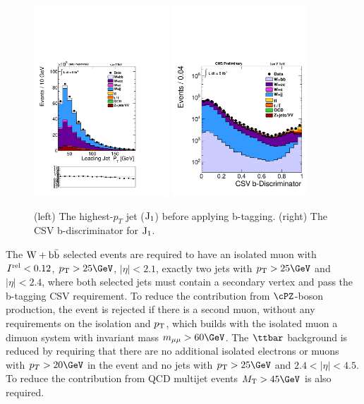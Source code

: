 \begin{figure}
\centering
\includegraphics[width=0.45\textwidth, trim = 0 4cm 0 0, clip=true ]{Wbb/fig1.pdf}
\includegraphics[width=0.45\textwidth]{Wbb/fig1_jetcsv.pdf}

\caption{(left) The highest-$p_{T}$ jet ($\rm{J_{1}}$) before applying b-tagging.
(right) The CSV b-discriminator 
for $\rm{J_{1}}$.}
\label{figA}
\end{figure}



The $\mathrm{W+\mathrm{b\bar{b}}}$ selected events are required to have  
an isolated muon with $I^{\rm{rel}}<0.12$, $\pt>25\GeV$, $|\eta|<2.1$,
exactly two jets with $\pt>25\GeV$ and $|\eta|<2.4$, where 
both selected jets must contain a secondary vertex 
and pass the b-tagging CSV requirement.
To reduce the contribution from $\cPZ$-boson production, the 
event is rejected if there is a second muon, without any requirements 
on the isolation and $p_\mathrm{T}$, 
which builds with the isolated muon a dimuon system with 
invariant mass $m_{\mu\mu} > 60\GeV$. 
The $\ttbar$ background is reduced by requiring
that there are no additional isolated electrons or muons with  $p_{T}>20\GeV$ in the event and no
jets with $\pt>25\GeV$ and $2.4<|\eta|<4.5$. To reduce the contribution
from QCD multijet events $\MT > 45\GeV$ is also required.

